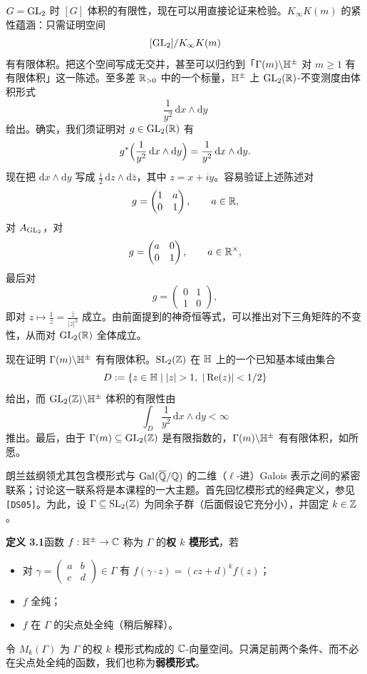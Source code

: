 $G=\operatorname{GL}_2$ 时 $[G]$ 体积的有限性，现在可以用直接论证来检验。$K_\infty K(m)$ 的紧性蕴涵：只需证明空间
\[
[\operatorname{GL}_2]/K_\infty K(m)
\]
有有限体积。把这个空间写成无交并，甚至可以归约到「$\Gamma(m)\backslash\mathbb{H}^\pm$ 对 $m\ge1$ 有有限体积」这一陈述。至多差 $\mathbb{R}_{>0}$ 中的一个标量，$\mathbb{H}^\pm$ 上 $\operatorname{GL}_2(\mathbb{R})$-不变测度由体积形式
\[
\frac{1}{y^2}\,\mathrm{d}x\wedge\mathrm{d}y
\]
给出。确实，我们须证明对 $g\in\operatorname{GL}_2(\mathbb{R})$ 有
\[
g^*\Bigl(\frac{1}{y^2}\,\mathrm{d}x\wedge\mathrm{d}y\Bigr)=\frac{1}{y^2}\,\mathrm{d}x\wedge\mathrm{d}y.
\]
现在把 $\mathrm{d}x\wedge\mathrm{d}y$ 写成 $\frac{i}{2}\,\mathrm{d}z\wedge\mathrm{d}\bar z$，其中 $z=x+iy$。容易验证上述陈述对
\[
g=\begin{pmatrix}1&a\\0&1\end{pmatrix},\qquad a\in\mathbb{R},
\]
对 $A_{\operatorname{GL}_2}$，对
\[
g=\begin{pmatrix}a&0\\0&1\end{pmatrix},\qquad a\in\mathbb{R}^\times,
\]
最后对
\[
g=\begin{pmatrix}0&1\\1&0\end{pmatrix},
\]
即对 $z\mapsto\frac{1}{z}=\frac{\bar z}{|z|^2}$ 成立。由前面提到的神奇恒等式，可以推出对下三角矩阵的不变性，从而对 $\operatorname{GL}_2(\mathbb{R})$ 全体成立。

现在证明 $\Gamma(m)\backslash\mathbb{H}^\pm$ 有有限体积。$\operatorname{SL}_2(\mathbb{Z})$ 在 $\mathbb{H}$ 上的一个已知基本域由集合
\[
D:=\{z\in\HH\mid |z|>1,\ |\operatorname{Re}(z)|<1/2\}
\]
给出，而 $\operatorname{GL}_2(\mathbb{Z})\backslash\mathbb{H}^\pm$ 体积的有限性由
\[
\int_D\frac{1}{y^2}\,\mathrm{d}x\wedge\mathrm{d}y<\infty
\]
推出。最后，由于 $\Gamma(m)\subseteq\operatorname{GL}_2(\mathbb{Z})$ 是有限指数的，$\Gamma(m)\backslash\mathbb{H}^\pm$ 有有限体积，如所愿。

朗兰兹纲领尤其包含模形式与 $\operatorname{Gal}(\overline{\mathbb{Q}}/\mathbb{Q})$ 的二维（$\ell$-进）Galois 表示之间的紧密联系；讨论这一联系将是本课程的一大主题。首先回忆模形式的经典定义，参见 \texttt{[DS05]}。为此，设 $\Gamma\subseteq\operatorname{SL}_2(\mathbb{Z})$ 为同余子群（后面假设它充分小），并固定 $k\in\mathbb{Z}$。

\noindent\textbf{定义 3.1}\label{def:3.1}\quad 函数 $f:\mathbb{H}^\pm\to\mathbb{C}$ 称为 $\Gamma$ 的\textbf{权 $k$ 模形式}，若
\begin{itemize}
\item 对 $\gamma=\begin{pmatrix}a&b\\c&d\end{pmatrix}\in\Gamma$ 有 $f(\gamma\cdot z)=(cz+d)^kf(z)$；
\item $f$ 全纯；
\item $f$ 在 $\Gamma$ 的尖点处全纯（稍后解释）。
\end{itemize}
令 $M_k(\Gamma)$ 为 $\Gamma$ 的权 $k$ 模形式构成的 $\mathbb{C}$-向量空间。只满足前两个条件、而不必在尖点处全纯的函数，我们也称为\textbf{弱模形式}。

